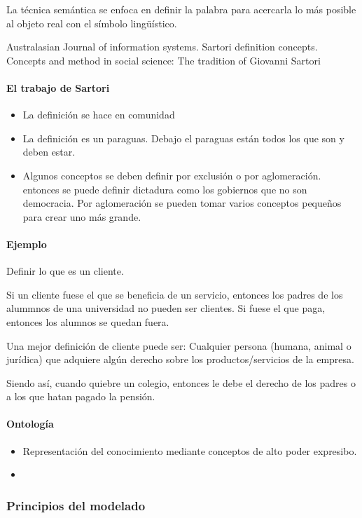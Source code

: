 La técnica semántica se enfoca en definir la palabra para acercarla lo más posible al objeto real con el símbolo lingüístico. 

Australasian Journal of information systems.
Sartori definition concepts. Concepts and method in social science: The tradition of Giovanni Sartori
\paragraph*{El trabajo de Sartori} 
\begin{itemize}
    \item La definición se hace en comunidad
    \item La definición es un paraguas. Debajo el paraguas están todos los que son y deben estar.  
    \item Algunos conceptos se deben definir por exclusión o por aglomeración. \\
    entonces se puede definir dictadura como los gobiernos que no son democracia. 
    Por aglomeración se pueden tomar varios conceptos pequeños para crear uno más grande. 
\end{itemize}

\paragraph*{Ejemplo} Definir lo que es un cliente. 


Si un cliente fuese el que se beneficia de un servicio, entonces los padres 
de los alummnos de una universidad no pueden ser clientes. Si fuese el que paga,
entonces los alumnos se quedan fuera. 

Una mejor definición de cliente puede ser: Cualquier persona (humana, animal o jurídica) que adquiere algún
derecho sobre los productos/servicios de la empresa. 

Siendo así, cuando quiebre un colegio, entonces le debe el derecho de los
padres o a los que hatan pagado la pensión.
\paragraph*{Ontología} 
\begin{itemize}
    \item Representación del conocimiento mediante conceptos de alto poder expresibo. 
    \item  
\end{itemize}
\subsubsection*{Principios del modelado}

